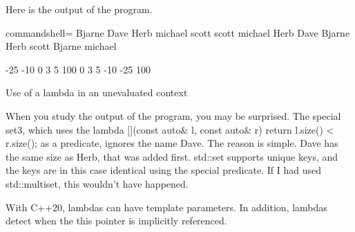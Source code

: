 Here is the output of the program.

\begin{tcblisting}{commandshell={}}
Bjarne Dave Herb michael scott
scott michael Herb Dave Bjarne
Herb scott Bjarne michael

-25 -10 0 3 5 100
0 3 5 -10 -25 100
\end{tcblisting}

\begin{center}
Use of a lambda in an unevaluated context
\end{center}

When you study the output of the program, you may be surprised. The special set3, which uses the lambda [](const auto\& l, const auto\& r){ return l.size() < r.size(); } as a predicate, ignores the name Dave. The reason is simple. Dave has the same size as Herb, that was added first. std::set supports unique keys, and the keys are in this case identical using the special predicate. If I had used std::multiset, this wouldn’t have happened.

\begin{tcolorbox}[colback=mygreen!5!white,colframe=mygreen!75!black,title={Distilled Information}]
With C++20, lambdas can have template parameters. In addition, lambdas detect when the this pointer is implicitly referenced.
\end{tcolorbox}










